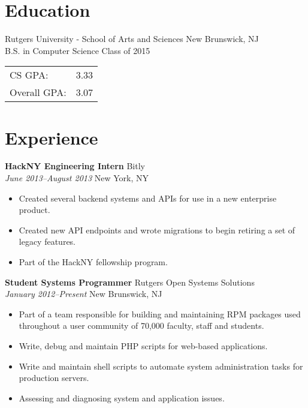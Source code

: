 \documentclass[centered,overlapped]{res}
\begin{document}

\address{153 Riveredge Road \\ Tinton Falls, NJ 07724}
\address{josh@jmatthews.us \\ github.com/jmatth}

\begin{resume}


\section{Education}

Rutgers University - School of Arts and Sciences \hfill New Brunswick, NJ\\
B.S. in Computer Science \hfill Class of 2015 \\
\begin{tabular}{l l}
	CS GPA: & 3.33 \\
	Overall GPA: & 3.07 \\
\end{tabular}

\section{Experience}

{\bf HackNY Engineering Intern} \hfill Bitly\\
\textit{June 2013--August 2013} \hfill New York, NY
\begin{itemize} \itemsep -2pt %
	\item Created several backend systems and APIs for use in a new enterprise
        product.
    \item Created new API endpoints and wrote migrations to begin retiring a set
        of legacy features.
    \item Part of the HackNY fellowship program.
\end{itemize}

{\bf Student Systems Programmer} \hfill Rutgers Open Systems Solutions\\
\textit{January 2012--Present} \hfill New Brunswick, NJ
\begin{itemize} \itemsep -2pt %
	\item Part of a team responsible for building and maintaining RPM packages used throughout a user community of 70,000 faculty, staff and students.
	\item Write, debug and maintain PHP scripts for web-based applications.
	\item Write and maintain shell scripts to automate system administration tasks for production servers.
	\item Assessing and diagnosing system and application issues.
\end{itemize}


\end{resume}
\end{document}
